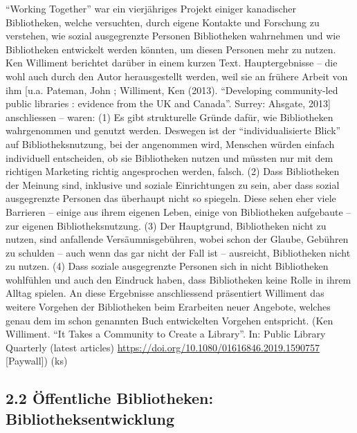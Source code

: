 \documentclass[a4paper,
fontsize=11pt,
oneside,
numbers=noperiodatend,
parskip=half-,
bibliography=totoc,
final
]{scrartcl}
\begin{document}
\enquote{Working Together} war ein vierjähriges Projekt einiger
kanadischer Bibliotheken, welche versuchten, durch eigene Kontakte und
Forschung zu verstehen, wie sozial ausgegrenzte Personen Bibliotheken
wahrnehmen und wie Bibliotheken entwickelt werden könnten, um diesen
Personen mehr zu nutzen. Ken Williment berichtet darüber in einem kurzen
Text. Hauptergebnisse -- die wohl auch durch den Autor herausgestellt
werden, weil sie an frühere Arbeit von ihm {[}u.a. Pateman, John ;
Williment, Ken (2013). \enquote{Developing community-led public
libraries : evidence from the UK and Canada}. Surrey: Ahsgate, 2013{]}
anschliessen -- waren: (1) Es gibt strukturelle Gründe dafür, wie
Bibliotheken wahrgenommen und genutzt werden. Deswegen ist der
\enquote{individualisierte Blick} auf Bibliotheksnutzung, bei der
angenommen wird, Menschen würden einfach individuell entscheiden, ob sie
Bibliotheken nutzen und müssten nur mit dem richtigen Marketing richtig
angesprochen werden, falsch. (2) Dass Bibliotheken der Meinung sind,
inklusive und soziale Einrichtungen zu sein, aber dass sozial
ausgegrenzte Personen das überhaupt nicht so spiegeln. Diese sehen eher
viele Barrieren -- einige aus ihrem eigenen Leben, einige von
Bibliotheken aufgebaute -- zur eigenen Bibliotheksnutzung. (3) Der
Hauptgrund, Bibliotheken nicht zu nutzen, sind anfallende
Versäumnisgebühren, wobei schon der Glaube, Gebühren zu schulden -- auch
wenn das gar nicht der Fall ist -- ausreicht, Bibliotheken nicht zu
nutzen. (4) Dass soziale ausgegrenzte Personen sich in nicht
Bibliotheken wohlfühlen und auch den Eindruck haben, dass Bibliotheken
keine Rolle in ihrem Alltag spielen. An diese Ergebnisse anschliessend
präsentiert Williment das weitere Vorgehen der Bibliotheken beim
Erarbeiten neuer Angebote, welches genau dem im schon genannten Buch
entwickelten Vorgehen entspricht. (Ken Williment. \enquote{It Takes a
Community to Create a Library}. In: Public Library Quarterly (latest
articles) \url{https://doi.org/10.1080/01616846.2019.1590757}
{[}Paywall{]}) (ks)

\hypertarget{uxf6ffentliche-bibliotheken-bibliotheksentwicklung}{%
\subsection{2.2 Öffentliche Bibliotheken:
Bibliotheksentwicklung}\label{uxf6ffentliche-bibliotheken-bibliotheksentwicklung}}
\end{document}
